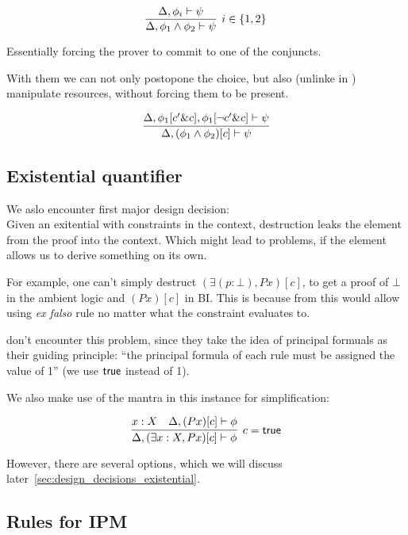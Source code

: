 $$
\infer[ i \in \{1,2\} ]
      {\Delta, \phi_1 \wedge \phi_2 \vdash \psi}
      {\Delta, \phi_i \vdash \psi}
$$

Essentially forcing the prover to commit to one of the conjuncts.

With them we can not only postopone the choice, but also (unlinke in \cite{Harland_Pym_2003}) manipulate resources, without forcing them to be present.

$$
\infer{\Delta, (\phi_1 \wedge \phi_2)[c] \vdash \psi}
      {\Delta, \phi_1[c' \& c], \phi_1[\neg c' \& c] \vdash \psi}
$$

\subsection{Existential quantifier}

We aslo encounter first major design decision:\\
Given an exitential with constraints in the context, destruction leaks the element from the proof into the context.
Which might lead to problems, if the element allows us to derive something on its own.

For example, one can't simply destruct $(\exists (p : \bot), P x)[c]$, to get a proof of $\bot$ in the ambient logic and $(P x)[c]$ in BI\@.
This is because from this would allow using \emph{ex falso} rule no matter what the constraint evaluates to.

\citet{Harland_Pym_2003} don't encounter this problem, since they take the idea of principal formuals as their guiding principle: ``the principal formula of each rule must be assigned the value of 1'' (we use $\textsf{true}$ instead of 1).

We also make use of the mantra in this instance for simplification:

$$
\infer[c = \true]
      {\Delta, (\exists x : X, P x)[c] \vdash \phi}
      {x : X &
       \Delta, (P x)[c] \vdash \phi}
$$

However, there are several options, which we will discuss later~\ref{sec:design_decisions_existential}.

\subsection{Rules for IPM}

